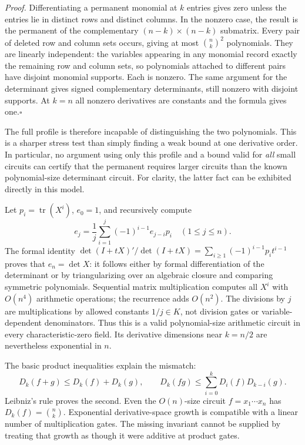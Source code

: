 \documentclass[11pt,a4paper]{article}
\numberwithin{equation}{section}
\begin{document}
\emph{Proof.} Differentiating a permanent monomial at $k$ entries gives
zero unless the entries lie in distinct rows and distinct columns. In the
nonzero case, the result is the permanent of the complementary
$(n-k)\times(n-k)$ submatrix. Every pair of deleted row and column sets
occurs, giving at most $\binom nk^2$ polynomials. They are linearly independent:
the variables appearing in any monomial record exactly the remaining row
and column sets, so polynomials attached to different pairs have disjoint
monomial supports. Each is nonzero. The same argument for the determinant
gives signed complementary determinants, still nonzero with disjoint
supports. At $k=n$ all nonzero derivatives are constants and the formula
gives one.\hfill$\square$

The full profile is therefore incapable of distinguishing the two
polynomials. This is a sharper stress test than simply finding a weak bound
at one derivative order. In particular, no argument using only this profile
and a bound valid for \emph{all} small circuits can certify that the permanent
requires larger circuits than the known polynomial-size determinant circuit.
For clarity, the latter fact can be exhibited directly in this model.

Let $p_i=\operatorname{tr}(X^i)$, $e_0=1$, and recursively compute
\begin{equation}\label{r32:newton}
 e_j=\frac1j\sum_{i=1}^j(-1)^{i-1}e_{j-i}p_i
 \quad(1\le j\le n).
\end{equation}
The formal identity
$\det(I+tX)'/\det(I+tX)=\sum_{i\ge1}(-1)^{i-1}p_i t^{i-1}$
proves that $e_n=\det X$: it follows either by formal differentiation of the
determinant or by triangularizing over an algebraic closure and comparing
symmetric polynomials. Sequential matrix multiplication computes all $X^i$
with $O(n^4)$ arithmetic operations; the recurrence adds $O(n^2)$.
The divisions by $j$ are multiplications by allowed constants $1/j\in K$,
not division gates or variable-dependent denominators. Thus this is a
valid polynomial-size arithmetic circuit in every characteristic-zero field.
Its derivative dimensions near $k=n/2$ are nevertheless exponential in $n$.

The basic product inequalities explain the mismatch:
\[
 D_k(f+g)\le D_k(f)+D_k(g),\qquad
 D_k(fg)\le\sum_{i=0}^kD_i(f)D_{k-i}(g).
\]
Leibniz's rule proves the second. Even the $O(n)$-size circuit
$f=x_1\cdots x_n$ has $D_k(f)=\binom nk$. Exponential derivative-space
growth is compatible with a linear number of multiplication gates. The
missing invariant cannot be supplied by treating that growth as though it
were additive at product gates.
\end{document}
